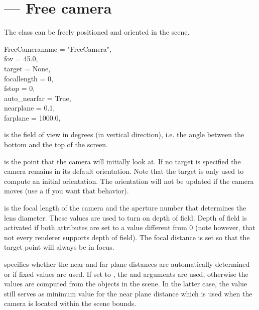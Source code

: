
\section{ ---
         Free camera}

The  class can be freely positioned and oriented in 
the scene.

\begin{classdesc}{FreeCamera}{name = "FreeCamera",\\ 
                       fov = 45.0,\\
                       target = None,\\
                       focallength = 0,\\
                       fstop = 0,\\
                       auto_nearfar = True,\\
                       nearplane = 0.1,\\
                       farplane = 1000.0,\\
                       }

 is the field of view in degrees (in vertical direction), i.e.
the angle between the bottom and the top of the screen.

 is the point that the camera will initially look at. If no
target is specified the camera remains in its default orientation. Note
that the target is only used to compute an initial orientation. The
orientation will not be updated if the camera moves (use a 
 if you want that behavior).

 is the focal length of the camera and  the
aperture number that determines the lens diameter. These values are used
to turn on depth of field. Depth of field is activated if both attributes
are set to a value different from 0 (note however, that not every renderer
supports depth of field). The focal distance is set so that the target 
point will always be in focus.

 specifies whether the near and far plane
distances are automatically determined or if fixed values are used.
If set to , the  and  arguments
are used, otherwise the values are computed from the objects in the scene.
In the latter case, the  value still serves as minimum
value for the near plane distance which is used when the camera is located
within the scene bounds.
\end{classdesc}

